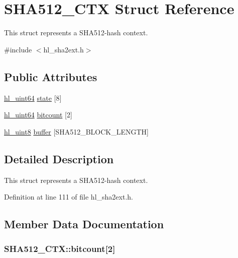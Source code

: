 \hypertarget{struct_s_h_a512___c_t_x}{
\section{SHA512\_\-CTX Struct Reference}
\label{struct_s_h_a512___c_t_x}
}


This struct represents a SHA512-\/hash context.  


{\ttfamily \#include $<$hl\_\-sha2ext.h$>$}\subsection*{Public Attributes}
\begin{DoxyCompactItemize}
\item 
\hyperlink{hl__types_8h_acab20cc881134266c8bb4c3d27e1c906}{hl\_\-uint64} \hyperlink{struct_s_h_a512___c_t_x_a2d7d34b1abae336a931c9a9235dd92c4}{state} \mbox{[}8\mbox{]}
\item 
\hyperlink{hl__types_8h_acab20cc881134266c8bb4c3d27e1c906}{hl\_\-uint64} \hyperlink{struct_s_h_a512___c_t_x_a49f2d4240ae20ff63182fb2c96c08ef7}{bitcount} \mbox{[}2\mbox{]}
\item 
\hyperlink{hl__types_8h_adc1917ae5f0dc40725be12536ffe0a6c}{hl\_\-uint8} \hyperlink{struct_s_h_a512___c_t_x_a26fa2e99b83bac3aa5afc37b4a4f3205}{buffer} \mbox{[}SHA512\_\-BLOCK\_\-LENGTH\mbox{]}
\end{DoxyCompactItemize}


\subsection{Detailed Description}
This struct represents a SHA512-\/hash context. 

Definition at line 111 of file hl\_\-sha2ext.h.

\subsection{Member Data Documentation}
\hypertarget{struct_s_h_a512___c_t_x_a49f2d4240ae20ff63182fb2c96c08ef7}{
\subsubsection[{bitcount}]{ {\bf SHA512\_\-CTX::bitcount}\mbox{[}2\mbox{]}}}
\label{struct_s_h_a512___c_t_x_a49f2d4240ae20ff63182fb2c96c08ef7}



